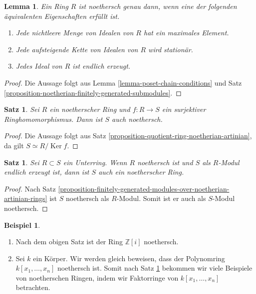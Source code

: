 \documentclass[reqno,12pt]{article}
\numberwithin{equation}{section}
\newcommand{\bZ}{\mathbb{Z}}
\newcommand{\iso}{\simeq}
\newcommand{\Ker}{\text{Ker }}
\theoremstyle{plain}
\newtheorem{lemma}[thm]{Lemma}
\newtheorem{proposition}[thm]{Satz}
\theoremstyle{definition}
\newtheorem{example}[thm]{Beispiel}
\renewcommand{\Ker}{\operatorname{Ker}}
\begin{document}
\begin{lemma}
Ein Ring $R$ ist noethersch genau dann, wenn eine der folgenden äquivalenten Eigenschaften erfüllt ist.
\begin{enumerate}
\item Jede nichtleere Menge von Idealen von $R$ hat ein maximales Element.
\item Jede aufsteigende Kette von Idealen von $R$ wird stationär.
\item Jedes Ideal von $R$ ist endlich erzeugt.
\end{enumerate}
\end{lemma}

\begin{proof}
Die Aussage folgt aus Lemma \ref{lemma-poset-chain-conditions} und Satz \ref{proposition-noetherian-finitely-generated-submodules}.
\end{proof}


\begin{proposition}\label{proposition-homomorphic-image-noetherian}
Sei $R$ ein noetherscher Ring und $f \colon R \to S$ ein surjektiver Ringhomomorphismus. Dann ist $S$ auch noethersch.
\end{proposition}

\begin{proof}
Die Aussage folgt aus Satz \ref{proposition-quotient-ring-noetherian-artinian}, da gilt $S \iso R/\Ker f$.
\end{proof}

\begin{proposition}
Sei $R \subset S$ ein Unterring. Wenn $R$ noethersch ist und $S$ als $R$-Modul endlich erzeugt ist, dann ist $S$ auch ein noetherscher Ring.
\end{proposition}

\begin{proof}
Nach Satz \ref{proposition-finitely-generated-modules-over-noetherian-artinian-rings} ist $S$ noethersch als $R$-Modul. Somit ist er auch als $S$-Modul noethersch.
\end{proof}


\begin{example}
\
\begin{enumerate}
\item Nach dem obigen Satz ist der Ring $\bZ[i]$ noethersch.

\item Sei $k$ ein Körper. Wir werden gleich beweisen, dass der Polynomring $k[x_1, \dots, x_n]$ noethersch ist. Somit nach Satz \ref{proposition-homomorphic-image-noetherian} bekommen wir viele Beispiele von noetherschen Ringen, indem wir Faktorringe von $k[x_1, \dots, x_n]$ betrachten.
\end{enumerate}

\end{example}
\end{document}
